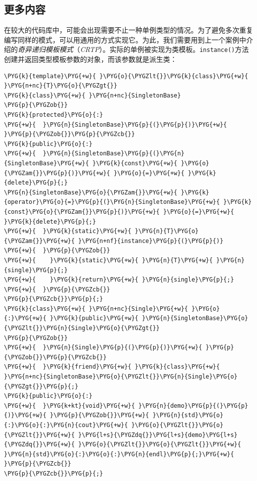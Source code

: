 
\subsection{更多内容}



在较大的代码库中，可能会出现需要不止一种单例类型的情况。为了避免多次重复编写同样的模式，可以用通用的方式实现它。为此，我们需要用到上一个案例中介绍的\textit{奇异递归模板模式}（\textit{CRTP}）。实际的单例被实现为类模板。\texttt{instance()}方法创建并返回类型模板参数的对象，而该参数就是派生类：



\begin{codeblockbg}
\begin{Verbatim}[commandchars=\\\{\},breaklines=true,breakanywhere=true,fontsize=\codefont,xleftmargin=17bp]
\PYG{k}{template}\PYG{+w}{ }\PYG{o}{\PYGZlt{}}\PYG{k}{class}\PYG{+w}{ }\PYG{n+nc}{T}\PYG{o}{\PYGZgt{}}
\PYG{k}{class}\PYG{+w}{ }\PYG{n+nc}{SingletonBase}
\PYG{p}{\PYGZob{}}
\PYG{k}{protected}\PYG{o}{:}
\PYG{+w}{  }\PYG{n}{SingletonBase}\PYG{p}{(}\PYG{p}{)}\PYG{+w}{ }\PYG{p}{\PYGZob{}}\PYG{p}{\PYGZcb{}}
\PYG{k}{public}\PYG{o}{:}
\PYG{+w}{  }\PYG{n}{SingletonBase}\PYG{p}{(}\PYG{n}{SingletonBase}\PYG{+w}{ }\PYG{k}{const}\PYG{+w}{ }\PYG{o}{\PYGZam{}}\PYG{p}{)}\PYG{+w}{ }\PYG{o}{=}\PYG{+w}{ }\PYG{k}{delete}\PYG{p}{;}
\PYG{n}{SingletonBase}\PYG{o}{\PYGZam{}}\PYG{+w}{ }\PYG{k}{operator}\PYG{o}{=}\PYG{p}{(}\PYG{n}{SingletonBase}\PYG{+w}{ }\PYG{k}{const}\PYG{o}{\PYGZam{}}\PYG{p}{)}\PYG{+w}{ }\PYG{o}{=}\PYG{+w}{ }\PYG{k}{delete}\PYG{p}{;}
\PYG{+w}{  }\PYG{k}{static}\PYG{+w}{ }\PYG{n}{T}\PYG{o}{\PYGZam{}}\PYG{+w}{ }\PYG{n+nf}{instance}\PYG{p}{(}\PYG{p}{)}
\PYG{+w}{  }\PYG{p}{\PYGZob{}}
\PYG{+w}{    }\PYG{k}{static}\PYG{+w}{ }\PYG{n}{T}\PYG{+w}{ }\PYG{n}{single}\PYG{p}{;}
\PYG{+w}{    }\PYG{k}{return}\PYG{+w}{ }\PYG{n}{single}\PYG{p}{;}
\PYG{+w}{  }\PYG{p}{\PYGZcb{}}
\PYG{p}{\PYGZcb{}}\PYG{p}{;}
\PYG{k}{class}\PYG{+w}{ }\PYG{n+nc}{Single}\PYG{+w}{ }\PYG{o}{:}\PYG{+w}{ }\PYG{k}{public}\PYG{+w}{ }\PYG{n}{SingletonBase}\PYG{o}{\PYGZlt{}}\PYG{n}{Single}\PYG{o}{\PYGZgt{}}
\PYG{p}{\PYGZob{}}
\PYG{+w}{  }\PYG{n}{Single}\PYG{p}{(}\PYG{p}{)}\PYG{+w}{ }\PYG{p}{\PYGZob{}}\PYG{p}{\PYGZcb{}}
\PYG{+w}{  }\PYG{k}{friend}\PYG{+w}{ }\PYG{k}{class}\PYG{+w}{ }\PYG{n+nc}{SingletonBase}\PYG{o}{\PYGZlt{}}\PYG{n}{Single}\PYG{o}{\PYGZgt{}}\PYG{p}{;}
\PYG{k}{public}\PYG{o}{:}
\PYG{+w}{  }\PYG{k+kt}{void}\PYG{+w}{ }\PYG{n}{demo}\PYG{p}{(}\PYG{p}{)}\PYG{+w}{ }\PYG{p}{\PYGZob{}}\PYG{+w}{ }\PYG{n}{std}\PYG{o}{:}\PYG{o}{:}\PYG{n}{cout}\PYG{+w}{ }\PYG{o}{\PYGZlt{}}\PYG{o}{\PYGZlt{}}\PYG{+w}{ }\PYG{l+s}{\PYGZdq{}}\PYG{l+s}{demo}\PYG{l+s}{\PYGZdq{}}\PYG{+w}{ }\PYG{o}{\PYGZlt{}}\PYG{o}{\PYGZlt{}}\PYG{+w}{ }\PYG{n}{std}\PYG{o}{:}\PYG{o}{:}\PYG{n}{endl}\PYG{p}{;}\PYG{+w}{ }\PYG{p}{\PYGZcb{}}
\PYG{p}{\PYGZcb{}}\PYG{p}{;}
\end{Verbatim}
\end{codeblockbg}


